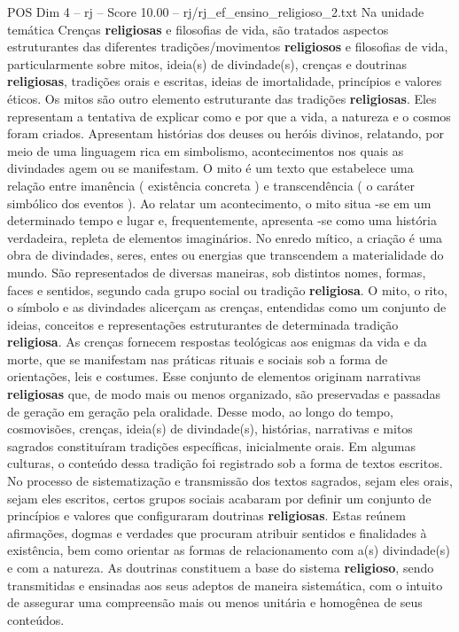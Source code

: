 \begin{textsample}{POS Dim 4 – rj – Score 10.00 – rj/rj\_ef\_ensino\_religioso\_2.txt}
Na unidade temática Crenças \textbf{religiosas} e filosofias de vida, são tratados aspectos estruturantes das diferentes tradições/movimentos \textbf{religiosos} e filosofias de vida, particularmente sobre mitos, ideia(s) de divindade(s), crenças e doutrinas \textbf{religiosas}, tradições orais e escritas, ideias de imortalidade, princípios e valores éticos.
Os mitos são outro elemento estruturante das tradições \textbf{religiosas}.
Eles representam a tentativa de explicar como e por que a vida, a natureza e o cosmos foram criados.
Apresentam histórias dos deuses ou heróis divinos, relatando, por meio de uma linguagem rica em simbolismo, acontecimentos nos quais as divindades agem ou se manifestam.
O mito é um texto que estabelece uma relação entre imanência ( existência concreta ) e transcendência ( o caráter simbólico dos eventos ).
Ao relatar um acontecimento, o mito situa -se em um determinado tempo e lugar e, frequentemente, apresenta -se como uma história verdadeira, repleta de elementos imaginários.
No enredo mítico, a criação é uma obra de divindades, seres, entes ou energias que transcendem a materialidade do mundo.
São representados de diversas maneiras, sob distintos nomes, formas, faces e sentidos, segundo cada grupo social ou tradição \textbf{religiosa}.
O mito, o rito, o símbolo e as divindades alicerçam as crenças, entendidas como um conjunto de ideias, conceitos e representações estruturantes de determinada tradição \textbf{religiosa}.
As crenças fornecem respostas teológicas aos enigmas da vida e da morte, que se manifestam nas práticas rituais e sociais sob a forma de orientações, leis e costumes.
Esse conjunto de elementos originam narrativas \textbf{religiosas} que, de modo mais ou menos organizado, são preservadas e passadas de geração em geração pela oralidade.
Desse modo, ao longo do tempo, cosmovisões, crenças, ideia(s) de divindade(s), histórias, narrativas e mitos sagrados constituíram tradições específicas, inicialmente orais.
Em algumas culturas, o conteúdo dessa tradição foi registrado sob a forma de textos escritos.
No processo de sistematização e transmissão dos textos sagrados, sejam eles orais, sejam eles escritos, certos grupos sociais acabaram por definir um conjunto de princípios e valores que configuraram doutrinas \textbf{religiosas}.
Estas reúnem afirmações, dogmas e verdades que procuram atribuir sentidos e finalidades à existência, bem como orientar as formas de relacionamento com a(s) divindade(s) e com a natureza.
As doutrinas constituem a base do sistema \textbf{religioso}, sendo transmitidas e ensinadas aos seus adeptos de maneira sistemática, com o intuito de assegurar uma compreensão mais ou menos unitária e homogênea de seus conteúdos.

\end{textsample}
